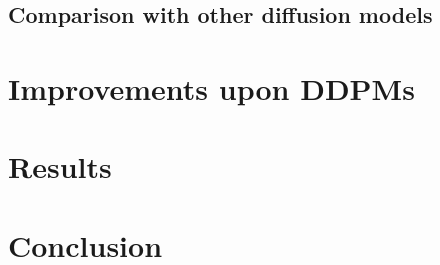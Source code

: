 \documentclass{article}
\begin{document}
\subsection{Comparison with other diffusion models}

\newpage
\section{Improvements upon DDPMs}

\newpage
\section{Results}

\newpage
\section{Conclusion}

\newpage
\appendix
\end{document}
